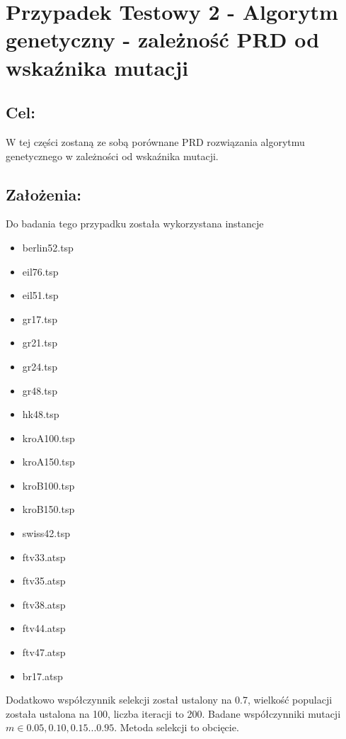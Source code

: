 \section{Przypadek Testowy 2 - Algorytm genetyczny - zależność PRD od wskaźnika mutacji}
  \subsection{Cel:}
    W tej części zostaną ze sobą porównane PRD rozwiązania algorytmu genetycznego w zależności od wskaźnika mutacji.
    \subsection{Założenia:}
    Do badania tego przypadku została wykorzystana instancje 
    \begin{itemize}
      \item berlin52.tsp
      \item eil76.tsp
      \item eil51.tsp
      \item gr17.tsp
      \item gr21.tsp
      \item gr24.tsp
      \item gr48.tsp
      \item hk48.tsp
      \item kroA100.tsp
      \item kroA150.tsp
      \item kroB100.tsp
      \item kroB150.tsp
      \item swiss42.tsp
      \item ftv33.atsp
      \item ftv35.atsp
      \item ftv38.atsp
      \item ftv44.atsp
      \item ftv47.atsp
      \item br17.atsp
    \end{itemize} 
    Dodatkowo współczynnik selekcji został ustalony na 0.7, wielkość populacji została ustalona na 100, liczba iteracji to 200. Badane współczynniki mutacji \(m \in {0.05, 0.10, 0.15 ... 0.95}\). Metoda selekcji to obcięcie.
